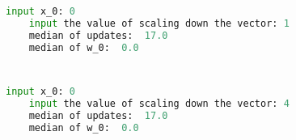 \documentclass{article}
\begin{document}
\begin{CJK*}{UTF8}{bsmi}
\section{}%
\begin{lstlisting}[language={python}]
	input x_0: 0
	input the value of scaling down the vector: 1
	median of updates:  17.0
	median of w_0:  0.0
\end{lstlisting}

\section{}%
\begin{lstlisting}[language={python}]
	input x_0: 0
	input the value of scaling down the vector: 4
	median of updates:  17.0
	median of w_0:  0.0
\end{lstlisting}


\end{CJK*}
\end{document}
